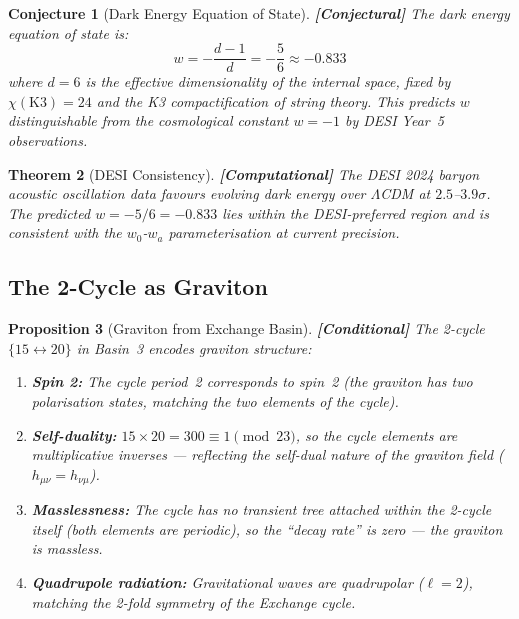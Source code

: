 \documentclass[12pt,a4paper]{article}
\newcommand{\conditional}[1]{\textcolor{conditional}{\textbf{[Conditional]}} #1}
\newcommand{\computational}[1]{\textcolor{computational}{\textbf{[Computational]}} #1}
\newcommand{\conjectural}[1]{\textcolor{conjectural}{\textbf{[Conjectural]}} #1}
\newtheorem{theorem}{Theorem}[section]\newtheorem{proposition}[theorem]{Proposition}
\newtheorem{conjecture}[theorem]{Conjecture}
\theoremstyle{definition}\newtheorem{definition}[theorem]{Definition}
\theoremstyle{remark}\newtheorem{remark}[theorem]{Remark}
\begin{document}
\begin{conjecture}[Dark Energy Equation of State]
\label{conj:dark_energy}
\conjectural{The dark energy equation of state is:}
\begin{equation}
  w = -\frac{d - 1}{d} = -\frac{5}{6} \approx -0.833
\end{equation}
where $d = 6$ is the effective dimensionality of the internal space, fixed by
$\chi(\mathrm{K3}) = 24$ and the K3 compactification of string theory. This
predicts $w$ distinguishable from the cosmological constant $w = -1$ by DESI
Year~5 observations.
\end{conjecture}

\begin{theorem}[DESI Consistency]
\label{thm:desi}
\computational{The DESI 2024 baryon acoustic oscillation data \cite{desi2024}
favours evolving dark energy over $\Lambda$CDM at $2.5$--$3.9\sigma$. The
predicted $w = -5/6 = -0.833$ lies within the DESI-preferred region and is
consistent with the $w_0$-$w_a$ parameterisation at current precision.}
\end{theorem}

\subsection{The 2-Cycle as Graviton}

\begin{proposition}[Graviton from Exchange Basin]
\label{prop:graviton}
\conditional{The 2-cycle $\{15 \leftrightarrow 20\}$ in Basin~3 encodes
graviton structure:}
\begin{enumerate}
  \item \textbf{Spin 2:} The cycle period~2 corresponds to spin~2 (the graviton
  has two polarisation states, matching the two elements of the cycle).
  \item \textbf{Self-duality:} $15 \times 20 = 300 \equiv 1 \pmod{23}$, so the
  cycle elements are multiplicative inverses --- reflecting the self-dual nature
  of the graviton field ($h_{\mu\nu} = h_{\nu\mu}$).
  \item \textbf{Masslessness:} The cycle has no transient tree attached
  \emph{within} the 2-cycle itself (both elements are periodic), so the
  ``decay rate'' is zero --- the graviton is massless.
  \item \textbf{Quadrupole radiation:} Gravitational waves are quadrupolar
  ($\ell = 2$), matching the 2-fold symmetry of the Exchange cycle.
\end{enumerate}
\end{proposition}
\end{document}
